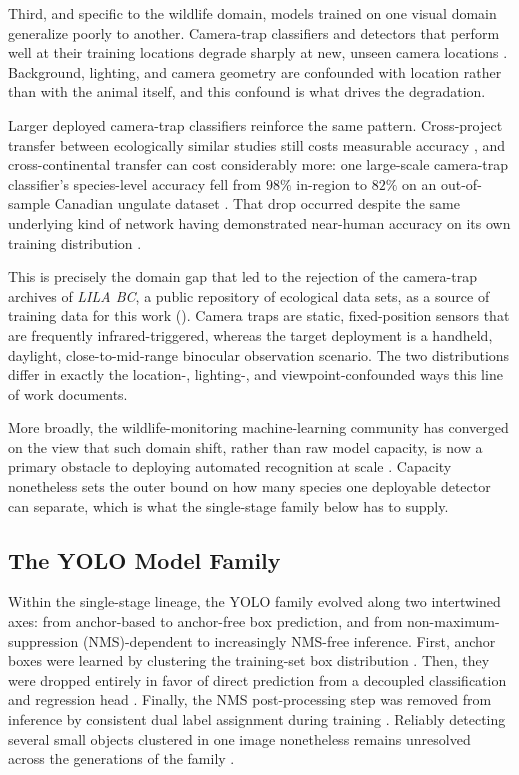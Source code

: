 Third, and specific to the wildlife domain, models trained on one visual domain generalize poorly to another. Camera-trap classifiers and detectors that perform well at their training locations degrade sharply at new, unseen camera locations \cite{beeryRecognitionTerraIncognita2018}. Background, lighting, and camera geometry are confounded with location rather than with the animal itself, and this confound is what drives the degradation.

Larger deployed camera-trap classifiers reinforce the same pattern. Cross-project transfer between ecologically similar studies still costs measurable accuracy \cite{williIdentifyingAnimalSpecies2019}, and cross-continental transfer can cost considerably more: one large-scale camera-trap classifier's species-level accuracy fell from $98\%$ in-region to $82\%$ on an out-of-sample Canadian ungulate dataset \cite{tabakMachineLearningClassify2019}. That drop occurred despite the same underlying kind of network having demonstrated near-human accuracy on its own training distribution \cite{norouzzadehAutomaticallyIdentifyingCounting2018}.

This is precisely the domain gap that led to the rejection of the camera-trap archives of \textit{LILA BC}, a public repository of ecological data sets, as a source of training data for this work (). Camera traps are static, fixed-position sensors that are frequently infrared-triggered, whereas the target deployment is a handheld, daylight, close-to-mid-range binocular observation scenario. The two distributions differ in exactly the location-, lighting-, and viewpoint-confounded ways this line of work documents.

More broadly, the wildlife-monitoring machine-learning community has converged on the view that such domain shift, rather than raw model capacity, is now a primary obstacle to deploying automated recognition at scale \cite{tuiaPerspectivesMachineLearning2022}. Capacity nonetheless sets the outer bound on how many species one deployable detector can separate, which is what the single-stage family below has to supply.

\subsection{The YOLO Model Family}\label{sec:lit_yolo_family}

Within the single-stage lineage, the YOLO family evolved along two intertwined axes: from anchor-based to anchor-free box prediction, and from non-maximum-suppression (NMS)-dependent to increasingly NMS-free inference. First, anchor boxes were learned by clustering the training-set box distribution \cite{redmonYOLO9000BetterFaster2017}. Then, they were dropped entirely in favor of direct prediction from a decoupled classification and regression head \cite{geYOLOXExceedingYOLO2021}. Finally, the NMS post-processing step was removed from inference by consistent dual label assignment during training \cite{wangYOLOv10RealTimeEndtoEnd2024}. Reliably detecting several small objects clustered in one image nonetheless remains unresolved across the generations of the family \cite{nazirYouOnlyLook2023}.

